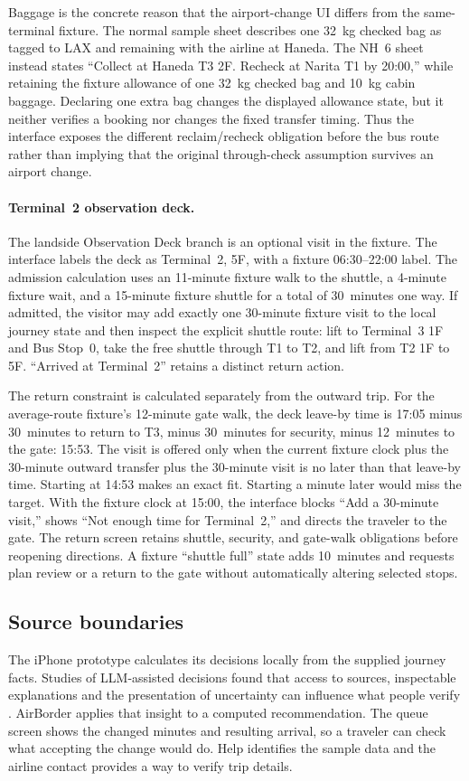 \documentclass[sigconf,nonacm,balance=false]{acmart}
\begin{document}
Baggage is the concrete reason that the airport-change UI differs from the
same-terminal fixture.  The normal sample sheet describes one 32~kg checked bag
as tagged to LAX and remaining with the airline at Haneda.  The NH~6 sheet instead
states ``Collect at Haneda T3 2F. Recheck at Narita T1 by 20:00,'' while retaining
the fixture allowance of one 32~kg checked bag and 10~kg cabin baggage.  Declaring
one extra bag changes the displayed allowance state, but it neither verifies a
booking nor changes the fixed transfer timing.  Thus the interface exposes the
different reclaim/recheck obligation before the bus route rather than implying that
the original through-check assumption survives an airport change.

\paragraph{Terminal~2 observation deck.} The landside Observation Deck branch is
an optional visit in the fixture. The interface labels the deck as Terminal~2, 5F, with a fixture 06:30--22:00
label.  The admission calculation uses an 11-minute fixture walk to
the shuttle, a 4-minute fixture wait, and a 15-minute fixture shuttle for a total of 30~minutes one way.  If admitted, the visitor may add exactly one 30-minute fixture visit to
the local journey state and then inspect the explicit shuttle route: lift to
Terminal~3 1F and Bus Stop~0, take the free shuttle through T1 to T2, and lift from
T2 1F to 5F.  ``Arrived at Terminal~2'' retains a distinct return action.

The return constraint is calculated separately from the outward trip.  For the
average-route fixture's 12-minute gate walk, the deck leave-by time is
17:05 minus 30~minutes to return to T3, minus 30~minutes for security, minus
12~minutes to the gate: 15:53.  The visit is offered only when the current fixture
clock plus the 30-minute outward transfer plus the 30-minute visit is no later than
that leave-by time.  Starting at 14:53 makes an exact fit. Starting a minute later would miss the target. With the fixture clock at 15:00, the interface blocks ``Add a
30-minute visit,'' shows ``Not enough time for Terminal~2,'' and directs the
traveler to the gate.   The return screen retains shuttle, security, and gate-walk
obligations before reopening directions.  A fixture ``shuttle full'' state adds
10~minutes and requests plan review or a return to the gate without automatically
altering selected stops.

\subsection{Source boundaries}
The iPhone prototype calculates its decisions locally from the supplied journey facts. Studies of LLM-assisted decisions found that access to sources, inspectable explanations and the presentation of uncertainty can influence what people verify \cite{ref219,ref220,ref222}. AirBorder applies that insight to a computed recommendation. The queue screen shows the changed minutes and resulting arrival, so a traveler can check what accepting the change would do. Help identifies the sample data and the airline contact provides a way to verify trip details.
\end{document}

